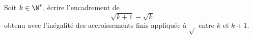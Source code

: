 Soit $k\in \N^*$, \'ecrire l'encadrement de 
\begin{displaymath}
\sqrt{k+1} -\sqrt{k} 
\end{displaymath}
obtenu avec l'in\'egalit\'e des accroissements finis appliqu\'ee \`a $\sqrt{}$ entre $k$ et $k+1$.

\bigskip \bigskip
